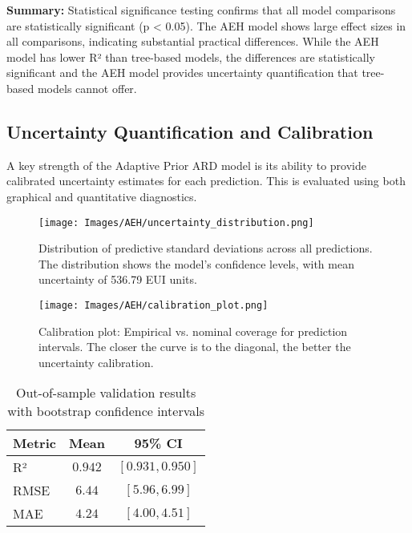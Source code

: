\textbf{Summary:} Statistical significance testing confirms that all model comparisons are statistically significant (p < 0.05). The AEH model shows large effect sizes in all comparisons, indicating substantial practical differences. While the AEH model has lower R² than tree-based models, the differences are statistically significant and the AEH model provides uncertainty quantification that tree-based models cannot offer.

\subsection{Uncertainty Quantification and Calibration}

A key strength of the Adaptive Prior ARD model is its ability to provide calibrated uncertainty estimates for each prediction. This is evaluated using both graphical and quantitative diagnostics.

\begin{figure}[ht]
    \centering
    \texttt{[image: Images/AEH/uncertainty\_distribution.png]}
    \caption{Distribution of predictive standard deviations across all predictions. The distribution shows the model's confidence levels, with mean uncertainty of 536.79 EUI units.}
    \label{fig:uncertainty_distribution}
\end{figure}

\begin{figure}[ht]
    \centering
    \texttt{[image: Images/AEH/calibration\_plot.png]}
    \caption{Calibration plot: Empirical vs. nominal coverage for prediction intervals. The closer the curve is to the diagonal, the better the uncertainty calibration.}
    \label{fig:calibration-plot}
\end{figure}

\begin{table}[h]
\centering
\caption{Out-of-sample validation results with bootstrap confidence intervals}
\label{tab:out_of_sample_validation}
\begin{tabular}{|l|c|c|}
\hline
\textbf{Metric} & \textbf{Mean} & \textbf{95\% CI} \\
\hline
R² & $0.942$ & $[0.931, 0.950]$ \\
RMSE & $6.44$ & $[5.96, 6.99]$ \\
MAE & $4.24$ & $[4.00, 4.51]$ \\
\hline
\end{tabular}
\end{table}

